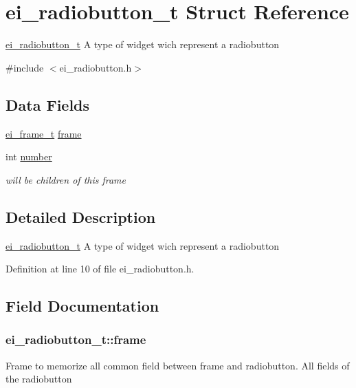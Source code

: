 \hypertarget{structei__radiobutton__t}{\section{ei\+\_\+radiobutton\+\_\+t Struct Reference}
\label{structei__radiobutton__t}
}


\hyperlink{structei__radiobutton__t}{ei\+\_\+radiobutton\+\_\+t} A type of widget wich represent a radiobutton  




{\ttfamily \#include $<$ei\+\_\+radiobutton.\+h$>$}

\subsection*{Data Fields}
\begin{DoxyCompactItemize}
\item 
\hyperlink{structei__frame__t}{ei\+\_\+frame\+\_\+t} \hyperlink{structei__radiobutton__t_a8dc9bfc5f60d7e018fbaa80787f6857f}{frame}
\item 
int \hyperlink{structei__radiobutton__t_a0b39fd134b987b3bfc1a850c4169886d}{number}
\begin{DoxyCompactList}\small\item\em will be children of this frame \end{DoxyCompactList}\end{DoxyCompactItemize}


\subsection{Detailed Description}
\hyperlink{structei__radiobutton__t}{ei\+\_\+radiobutton\+\_\+t} A type of widget wich represent a radiobutton 

Definition at line 10 of file ei\+\_\+radiobutton.\+h.



\subsection{Field Documentation}
\hypertarget{structei__radiobutton__t_a8dc9bfc5f60d7e018fbaa80787f6857f}{
\subsubsection[{frame}]{ ei\+\_\+radiobutton\+\_\+t\+::frame}}\label{structei__radiobutton__t_a8dc9bfc5f60d7e018fbaa80787f6857f}
Frame to memorize all common field between frame and radiobutton. All fields of the radiobutton 

